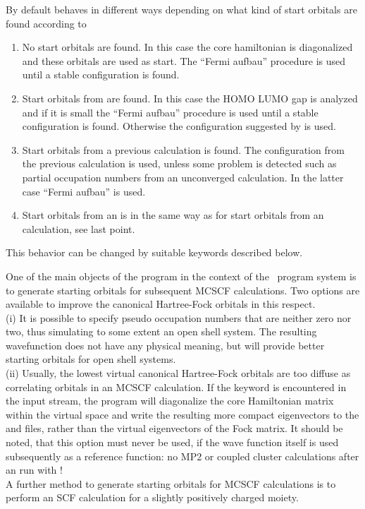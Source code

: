 By default  behaves in different ways depending on what
kind of start orbitals are found according to
\begin{enumerate}
\item No start orbitals are found. In this case the core hamiltonian
  is diagonalized and these orbitals are used as start.
  The ``Fermi aufbau'' procedure is used until a stable configuration is found.
\item Start orbitals from  are found.
  In this case the HOMO LUMO gap is analyzed and if it is small
  the ``Fermi aufbau'' procedure is used until a stable configuration is found.
  Otherwise the configuration suggested by  is used.
\item Start orbitals from a previous  calculation is found.
  The configuration from the previous  calculation is used,
  unless some problem is detected such as partial occupation numbers
  from an unconverged calculation. In the latter case ``Fermi aufbau'' is used.
\item Start orbitals from an  is in the same way as for
  start orbitals from an  calculation, see last point.
\end{enumerate}
This behavior can be changed by suitable keywords described below.

One of the main objects of the  program in the context of the
\molcas\ program system is to generate starting
orbitals for subsequent MCSCF calculations.
Two options are available to
improve the canonical Hartree-Fock orbitals in this respect.\\
(i) It is possible to specify pseudo occupation numbers that are neither
zero nor two, thus simulating to some extent an open shell system. The
resulting wavefunction does not have any physical meaning, but will
provide better starting orbitals for open shell systems.\\
(ii) Usually, the lowest virtual canonical Hartree-Fock orbitals are
too diffuse as correlating orbitals in an MCSCF calculation.
If the keyword  is encountered in the input stream, the
 program will diagonalize the core Hamiltonian matrix within
the virtual space and write the resulting more compact eigenvectors to the
 and  files,
rather than the virtual eigenvectors of the Fock
matrix. It should be noted, that this option must never be used, if the
 wave function itself is used subsequently as a reference
function: no MP2 or coupled cluster calculations after an
 run with  ! \\
A further method to generate starting orbitals for MCSCF calculations is
to perform an SCF calculation for a slightly positively charged moiety.


